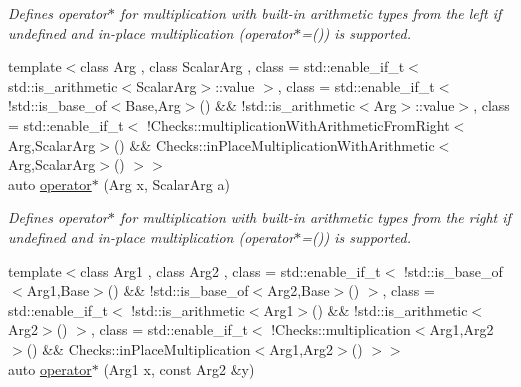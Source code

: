 \begin{DoxyCompactItemize}
\begin{DoxyCompactList}\small\item\em Defines operator$\ast$ for multiplication with built-\/in arithmetic types from the left if undefined and in-\/place multiplication (operator$\ast$=()) is supported. \end{DoxyCompactList}\item 
\hypertarget{namespaceRFFGen_a93b6636f13ac62c184a835f740600599}{{\footnotesize template$<$class Arg , class Scalar\-Arg , class  = std\-::enable\-\_\-if\-\_\-t$<$ std\-::is\-\_\-arithmetic$<$\-Scalar\-Arg$>$\-::value $>$, class  = std\-::enable\-\_\-if\-\_\-t$<$ !std\-::is\-\_\-base\-\_\-of$<$\-Base,\-Arg$>$() \&\& !std\-::is\-\_\-arithmetic$<$\-Arg$>$\-::value$>$, class  = std\-::enable\-\_\-if\-\_\-t$<$ !\-Checks\-::multiplication\-With\-Arithmetic\-From\-Right$<$\-Arg,\-Scalar\-Arg$>$() \&\&                                       Checks\-::in\-Place\-Multiplication\-With\-Arithmetic$<$\-Arg,\-Scalar\-Arg$>$() $>$$>$ }\\auto \hyperlink{namespaceRFFGen_a93b6636f13ac62c184a835f740600599}{operator$\ast$} (Arg x, Scalar\-Arg a)}\label{namespaceRFFGen_a93b6636f13ac62c184a835f740600599}

\begin{DoxyCompactList}\small\item\em Defines operator$\ast$ for multiplication with built-\/in arithmetic types from the right if undefined and in-\/place multiplication (operator$\ast$=()) is supported. \end{DoxyCompactList}\item 
\hypertarget{namespaceRFFGen_addccbcc59d562d0b8c61f084e40b692b}{{\footnotesize template$<$class Arg1 , class Arg2 , class  = std\-::enable\-\_\-if\-\_\-t$<$ !std\-::is\-\_\-base\-\_\-of$<$\-Arg1,\-Base$>$() \&\& !std\-::is\-\_\-base\-\_\-of$<$\-Arg2,\-Base$>$() $>$, class  = std\-::enable\-\_\-if\-\_\-t$<$ !std\-::is\-\_\-arithmetic$<$\-Arg1$>$() \&\& !std\-::is\-\_\-arithmetic$<$\-Arg2$>$() $>$, class  = std\-::enable\-\_\-if\-\_\-t$<$ !\-Checks\-::multiplication$<$\-Arg1,\-Arg2$>$() \&\&                                       Checks\-::in\-Place\-Multiplication$<$\-Arg1,\-Arg2$>$() $>$$>$ }\\auto \hyperlink{namespaceRFFGen_addccbcc59d562d0b8c61f084e40b692b}{operator$\ast$} (Arg1 x, const Arg2 \&y)}\label{namespaceRFFGen_addccbcc59d562d0b8c61f084e40b692b}


\end{DoxyCompactItemize}
